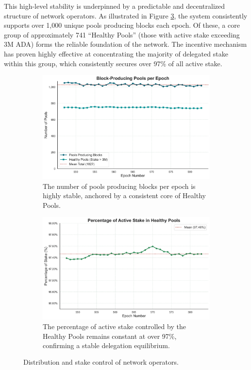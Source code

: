 \documentclass[11pt, letterpaper]{article}
\begin{document}
This high-level stability is underpinned by a predictable and decentralized
structure of network operators. As illustrated in Figure
\ref{fig:pool_structure}, the system consistently supports over 1,000 unique
pools producing blocks each epoch. Of these, a core group of approximately 741
``Healthy Pools'' (those with active stake exceeding 3M ADA) forms the reliable
foundation of the network. The incentive mechanism has proven highly effective
at concentrating the majority of delegated stake within this group, which
consistently secures over 97\% of all active stake.

\begin{figure}[H]
	\centering
	\begin{subfigure}{0.48\textwidth}
		\includegraphics[width=\textwidth]{img/pool_count_epoch.png}
		\caption{The number of pools producing blocks per epoch is highly stable, anchored by a consistent core of Healthy Pools.}
		\label{fig:pool_count}
	\end{subfigure}
	\hfill
	\begin{subfigure}{0.48\textwidth}
		\includegraphics[width=\textwidth]{img/stake_percentage_epoch.png}
		\caption{The percentage of active stake controlled by the Healthy Pools remains constant at over 97\%, confirming a stable delegation equilibrium.}
		\label{fig:stake_percentage}
	\end{subfigure}
	\caption{Distribution and stake control of network operators.}
	\label{fig:pool_structure}
\end{figure}
\end{document}
